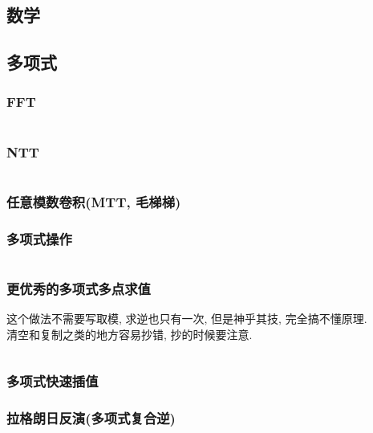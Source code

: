 \documentclass[a4paper, twoside]{article}
\begin{document}
	\begin{multicols}{2}
		\section{数学}
			
			\subsection{多项式}
				\subsubsection{FFT}
					\inputminted{cpp}{../src/math/FFT.cpp}

				\subsubsection{NTT}
					\inputminted{cpp}{../src/math/NTT.cpp}

				\subsubsection{任意模数卷积(MTT, 毛梯梯)}
					
			
				\subsubsection{多项式操作}
					\inputminted{cpp}{../src/math/多项式操作.cpp}

				\subsubsection{更优秀的多项式多点求值}
					这个做法不需要写取模, 求逆也只有一次, 但是神乎其技, 完全搞不懂原理. \\
					清空和复制之类的地方容易抄错, 抄的时候要注意.
					\inputminted{cpp}{../src/math/更优秀的多项式多点求值.cpp}

				\subsubsection{多项式快速插值}
					



				\subsubsection{拉格朗日反演(多项式复合逆)}
					


\end{multicols}
\end{document}
